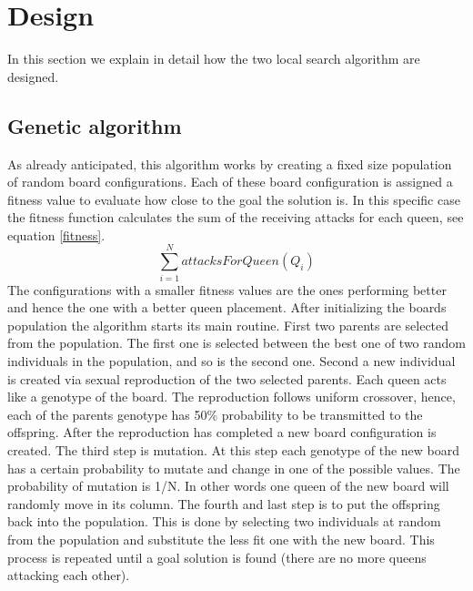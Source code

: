\documentclass[runningheads]{llncs}
\begin{document}
\section{Design}

In this section we explain in detail how the two local search
algorithm are designed.

\subsection{Genetic algorithm}
As already anticipated, this algorithm works by creating a fixed size population
of random board configurations. Each of these board configuration is
assigned a fitness value to evaluate how close to the goal the
solution is. In this specific case the fitness function calculates the
sum of the receiving attacks for each queen, see equation \ref{fitness}. 
\begin{equation} \label{fitness}
\sum_{i=1}^{N} attacksForQueen(Q_i)
\end{equation}
The configurations with a smaller fitness values are the ones
performing better and hence the one with a better queen
placement. After initializing the boards population the algorithm
starts its main routine. First two parents are selected from the population. The
first one is selected between the best one of two random individuals
in the population, and so is the second one. Second a new individual
is created via sexual reproduction of the two selected parents. Each
queen acts like a genotype of the board. The reproduction follows
uniform crossover, hence, each of the parents genotype has 50\%
probability to be transmitted to the offspring. After the reproduction
has completed a new board configuration is created. The third step is
mutation. At this step each genotype of the new board has a certain
probability to mutate and change in one of the possible values. The
probability of mutation is 1/N. In other words one queen of the new board
will randomly move in its column. The fourth and last step is to put
the offspring back into the population. This is done by selecting two
individuals at random from the population and substitute the less fit
one with the new board. This process is repeated until a goal solution
is found (there are no more queens attacking each other).
\end{document}
